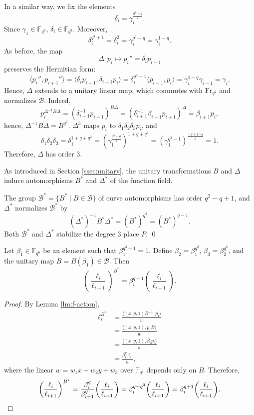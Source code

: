 \documentclass[entropy,article,submit,pdftex,moreauthors]{Definitions/mdpi}
\newcommand{\Frob}{{\mathrm{Fr}_{q^2}}}
\begin{document}
In a similar way, we fix the elements 
\[\delta_i=\gamma_i^\frac{q^3-q}{2}.\] %
Since $\gamma_1 \in \mathbb{F}_{q^3}$, $\delta_{i}\in \mathbb{F}_{q^3}$. Moreover,
\[\delta_i^{q^3+1}=\delta_i^2=\gamma_i^{q^3-q}=\gamma_i^{1-q}.\] 
As before, the map 
\[\Delta:p_i\mapsto p_i''=\delta_i p_{i-1}\]
preserves the Hermitian form:
\[\langle p_i'',p_{i+1}'' \rangle = \langle \delta_{i} p_{i-1}, \delta_{i+1} p_{i} \rangle = \delta_{i}^{q^3+1} \langle p_{i-1},p_{i} \rangle = \gamma_i^{1-q} \gamma_{i-1} =\gamma_i.\]
Hence, $\Delta$ extends to a unitary linear map, which commutes with $\Frob$ and normalizes $\mathcal{B}$. Indeed,
\[ p_{i}^{\Delta^{-1}B\Delta} = (\delta_{i+1}^{-1}p_{i+1})^{B\Delta} = (\delta_{i+1}^{-1}\beta_{i+1} p_{i+1})^\Delta = \beta_{i+1} p_i, \]
hence, $\Delta^{-1}B\Delta=B^{q^2}$. $\Delta^3$ maps $p_i$ to $\delta_1\delta_2\delta_3 p_i$, and
\[\delta_1\delta_2\delta_3=\delta_1^{1+q+q^2}=\left(\gamma_1^\frac{q^3-q}{2}\right)^{1+q+q^2}= \left(\gamma_1^{q^3-1}\right)^\frac{(q+1)q}{2}=1.\]
Therefore, $\Delta$ has order $3$. 

As introduced in Section \ref{ssec:unitary}, the unitary transformations $B$ and $\Delta$ induce automorphisms $B^*$ and $\Delta^*$ of the function field. 
\begin{Proposition}
The group $\mathcal{B}^* = \{B^* \mid B \in \mathcal{B}\}$ of curve automorphisms has order $q^2-q+1$, and $\Delta^*$ normalizes $\mathcal{B}^*$ by 
\[(\Delta^*)^{-1}B^*\Delta^*=(B^*)^{q^2}=(B^*)^{q-1}.\]
Both $\mathcal{B}^*$ and $\Delta^*$ stabilize the degree $3$ place $P$. \qed
\end{Proposition}

\begin{Proposition} \label{pr:B-star-elli} 
Let $\beta_1 \in \mathbb{F}_{q^6}$ be an element such that $\beta_1^{q^3+1}=1$. Define $\beta_2=\beta_1^{q^2}$, $\beta_3=\beta_2^{q^2}$, and the unitary map $B=B(\beta_1) \in \mathcal{B}$. Then 
\[\left(\frac{\ell_i}{\ell_{i+1}}\right)^{B^*} = \beta_i^{q+1}\left(\frac{\ell_i}{\ell_{i+1}}\right).\]
\end{Proposition}
\begin{proof}
By Lemma \ref{lm:f-action},
\begin{align*}
\ell_i^{B^*} & = \frac{\langle (x,y,1)B^{-1}, p_i \rangle }{w} \\
&= \frac{\langle (x,y,1), p_i B \rangle }{w} \\
&= \frac{\langle (x,y,1), \beta_i p_i \rangle }{w} \\
&= \frac{\beta_i^q \ell_i}{w},
\end{align*}
where the linear $w=w_1x+w_2y+w_3$ over $\mathbb{F}_{q^2}$ depends only on $B$. Therefore,
\[\left(\frac{\ell_i}{\ell_{i+1}}\right)^{B^*} = \frac{\beta_i^q}{\beta_{i+1}^q}\left(\frac{\ell_i}{\ell_{i+1}}\right) = \beta_i^{q-q^3}\left(\frac{\ell_i}{\ell_{i+1}}\right) = \beta_i^{q+1}\left(\frac{\ell_i}{\ell_{i+1}}\right). \qedhere\]
\end{proof}
\end{document}

